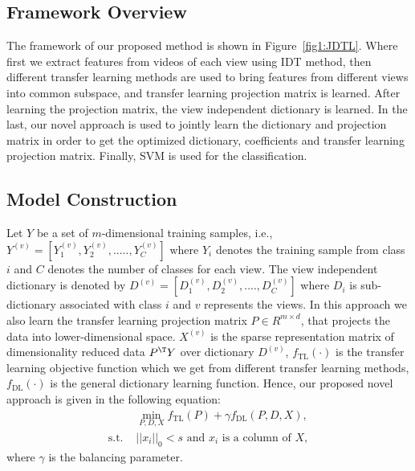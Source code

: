 \subsection{Framework Overview}
The framework of our proposed method is shown in Figure~\ref{fig1:JDTL}. Where first we extract features from videos of each view using IDT method, then different transfer learning methods are used to bring features from different views into common subspace, and transfer learning projection matrix is learned. After learning the projection matrix, the view independent dictionary is learned. In the last, our novel approach is used to jointly learn the dictionary and projection matrix in order to get the optimized dictionary, coefficients and transfer learning projection matrix. Finally, SVM is used for the classification.

\subsection{Model Construction}
Let $Y$ be a set of $m$-dimensional training samples, i.e., $Y^{(v)} = [Y_1^{(v)}, Y_2^{(v)}, ....., Y_C^{(v)}]$ where $Y_i$ denotes the training sample from class $i$ and $C$ denotes the number of classes for each view. The view independent dictionary is denoted by $D^{(v)}= [D_1^{(v)}, D_2^{(v)},....,D_C^{(v)}]$ where $D_i$ is sub-dictionary associated with class $i$ and $v$ represents the views. In this approach we also learn the transfer learning projection matrix $P \in R^{m\times d}$, that projects the data into lower-dimensional space. $X^{(v)}$ is the sparse representation matrix of dimensionality reduced data $P^\T Y$ over dictionary $D^{(v)}$,
$f_{\text{TL}}(\cdot)$ is the transfer learning objective function which we get from different transfer learning methods, $f_{\text{DL}}(\cdot)$ is the general dictionary learning function. Hence, our proposed novel approach is given in the following equation:
\begin{equation}
\begin{aligned}
& \min_{P,D,X} f_{\text{TL}}(P) + \gamma f_{\text{DL}}(P,D,X), \\
\text{s.t. } & ||x_i||_0 < s \text{ and } x_i \text { is a column of } X,
\end{aligned}
\label{label:JDLTL}
\end{equation}
where $\gamma$ is the balancing parameter.


